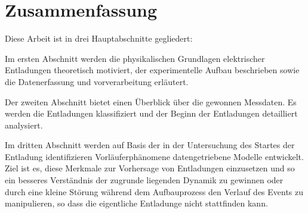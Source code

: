 \section{Zusammenfassung}
\label{sec:intro_summary}
Diese Arbeit ist in drei Hauptabschnitte gegliedert:

Im ersten Abschnitt werden die physikalischen Grundlagen elektrischer Entladungen theoretisch motiviert, der experimentelle Aufbau beschrieben sowie die Datenerfassung und vorverarbeitung erläutert. 

Der zweiten Abschnitt bietet einen Überblick über die gewonnen Messdaten. Es werden die Entladungen klassifiziert und der Beginn der Entladungen detailliert analysiert.

Im dritten Abschnitt werden auf Basis der in der Untersuchung des Startes der Entladung identifizieren Vorläuferphänomene datengetriebene Modelle entwickelt. Ziel ist es, diese Merkmale zur Vorhersage von Entladungen einzusetzen und so ein besseres Verständnis der zugrunde liegenden Dynamik zu gewinnen oder durch eine kleine Störung während dem Aufbauprozess den Verlauf des Events zu manipulieren, so dass die eigentliche Entladunge nicht stattfinden kann.
